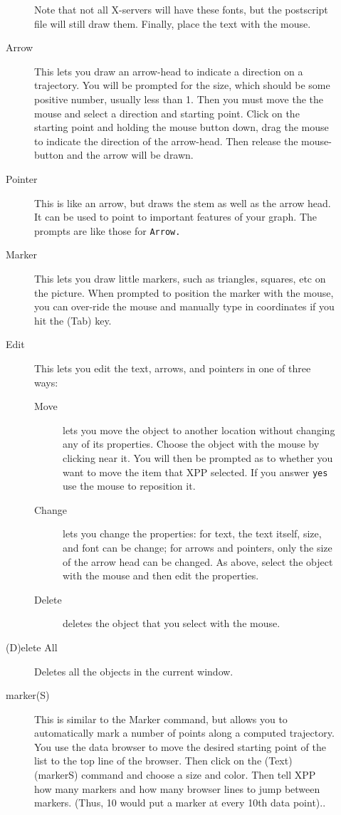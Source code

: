 \documentclass{article}
\begin{document}
\begin{description}
\begin{description}
Note that not all X-servers will have these fonts, but the
postscript file will still draw them. Finally, place the text with the
mouse.
\item[Arrow] This lets you draw an arrow-head to indicate a direction
on a trajectory.  You will be prompted for the size, which should be
some positive number, usually less than 1.  Then you must move the the
mouse and select a direction and starting point.  Click on the
starting point and holding the mouse button down, drag the mouse to
indicate the direction of the arrow-head. Then release the
mouse-button and the arrow will be drawn.
\item[Pointer] This is like an arrow, but draws the stem as well as
the arrow head.  It can be used to point to important features of your
graph. The prompts are like those for {\tt Arrow.}
\item[Marker] This lets you draw little markers, such as triangles,
squares, etc on the picture. When prompted to position the marker with
the mouse, you can over-ride the mouse and manually type in
coordinates if you hit the (Tab) key.
\item[Edit] This lets you edit the text, arrows, and pointers in one of
three ways:
\begin{description}
\item[Move] lets you move the object to another location without
changing any of its properties.  Choose the object with the mouse by
clicking near it.
You will then be prompted as to whether you want to move the item that
XPP selected.  If you answer {\tt yes} use the mouse to reposition it.
\item[Change] lets you change the properties: for text, the text
itself, size, and font can be change; for arrows and pointers, only
the size of the arrow head can be changed. As above, select the object
with the mouse and then edit the properties.
\item[Delete] deletes the object that you select with the mouse.
\end{description}
\item[(D)elete All] Deletes all the objects in the current window.
\item[marker(S)] This is similar to the Marker command, but allows you to
automatically mark a number of points along a computed trajectory. You
use the data browser to move the desired starting point of the list to
the top line of the browser. Then click on the (Text) (markerS)
command and choose a size and color. Then tell XPP how many markers
and how many browser lines to jump between markers. (Thus, 10 would
put a marker at every 10th data point)..




\end{description}
\end{description}
\end{document}
